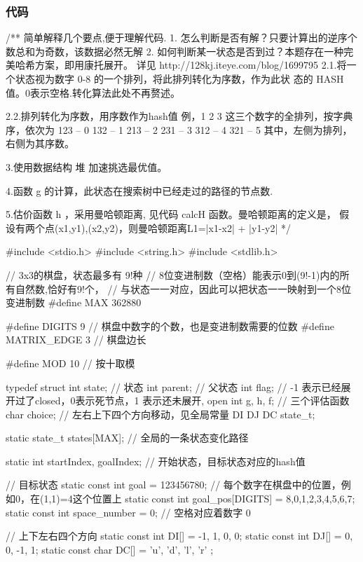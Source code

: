 \subsubsection{代码}
\begin{Codex}[label=eight_digits_astar.c]
/**
 简单解释几个要点,便于理解代码.
 1. 怎么判断是否有解？只要计算出的逆序个数总和为奇数，该数据必然无解
 2. 如何判断某一状态是否到过？本题存在一种完美哈希方案，即用康托展开。
    详见 http://128kj.iteye.com/blog/1699795
    2.1.将一个状态视为数字 0-8 的一个排列，将此排列转化为序数，作为此状
 态的 HASH 值。0表示空格.转化算法此处不再赘述。

    2.2.排列转化为序数，用序数作为hash值
    例，1 2 3 这三个数字的全排列，按字典序，依次为
 123 -- 0
 132 -- 1
 213 -- 2
 231 -- 3
 312 -- 4
 321 -- 5
 其中，左侧为排列，右侧为其序数。
 
 3.使用数据结构 堆 加速挑选最优值。
 
 4.函数 g 的计算，此状态在搜索树中已经走过的路径的节点数.
 
 5.估价函数 h ，采用曼哈顿距离, 见代码 calcH 函数。曼哈顿距离的定义是，
 假设有两个点(x1,y1),(x2,y2)，则曼哈顿距离L1=|x1-x2| + |y1-y2|
 */

#include <stdio.h>
#include <string.h>
#include <stdlib.h>

// 3x3的棋盘，状态最多有 9!种
// 8位变进制数（空格）能表示0到(9!-1)内的所有自然数,恰好有9!个，
// 与状态一一对应，因此可以把状态一一映射到一个8位变进制数
#define     MAX         362880

#define DIGITS 9 // 棋盘中数字的个数，也是变进制数需要的位数
#define     MATRIX_EDGE 3       // 棋盘边长

#define     MOD         10      // 按十取模

typedef struct {
    int state; // 状态
    int parent;     // 父状态
    int flag;   // -1 表示已经展开过了closed，0表示死节点，1 表示还未展开, open
    int g, h, f; // 三个评估函数
    char choice;  // 左右上下四个方向移动，见全局常量 DI DJ DC
} state_t;

static state_t states[MAX];  // 全局的一条状态变化路径

static int  startIndex, goalIndex; // 开始状态，目标状态对应的hash值

// 目标状态
static const int goal = 123456780;
// 每个数字在棋盘中的位置，例如0，在(1,1)=4这个位置上
static const int goal_pos[DIGITS] = {8,0,1,2,3,4,5,6,7};
static const int space_number = 0; // 空格对应着数字 0

// 上下左右四个方向
static const int DI[] = {-1, 1, 0, 0};
static const int DJ[] = {0, 0, -1, 1};
static const char DC[] = { 'u', 'd', 'l', 'r' };


\end{Codex}
